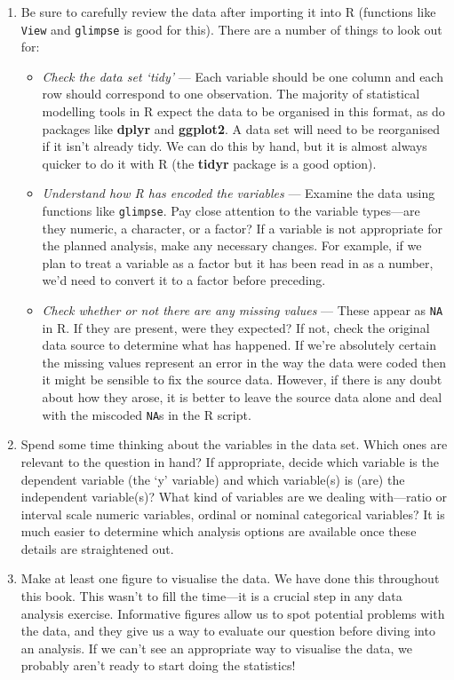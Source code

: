 \documentclass[
]{book}
\providecommand{\tightlist}{%
  \setlength{\itemsep}{0pt}\setlength{\parskip}{0pt}}
\begin{document}
\begin{enumerate}
\def\labelenumi{\arabic{enumi}.}
\item
  Be sure to carefully review the data after importing it into R (functions like \texttt{View} and \texttt{glimpse} is good for this). There are a number of things to look out for:

  \begin{itemize}
  \tightlist
  \item
    \emph{Check the data set `tidy'} --- Each variable should be one column and each row should correspond to one observation. The majority of statistical modelling tools in R expect the data to be organised in this format, as do packages like \textbf{dplyr} and \textbf{ggplot2}. A data set will need to be reorganised if it isn't already tidy. We can do this by hand, but it is almost always quicker to do it with R (the \textbf{tidyr} package is a good option).
  \item
    \emph{Understand how R has encoded the variables} --- Examine the data using functions like \texttt{glimpse}. Pay close attention to the variable types---are they numeric, a character, or a factor? If a variable is not appropriate for the planned analysis, make any necessary changes. For example, if we plan to treat a variable as a factor but it has been read in as a number, we'd need to convert it to a factor before preceding.
  \item
    \emph{Check whether or not there are any missing values} --- These appear as \texttt{NA} in R. If they are present, were they expected? If not, check the original data source to determine what has happened. If we're absolutely certain the missing values represent an error in the way the data were coded then it might be sensible to fix the source data. However, if there is any doubt about how they arose, it is better to leave the source data alone and deal with the miscoded \texttt{NA}s in the R script.
  \end{itemize}
\item
  Spend some time thinking about the variables in the data set. Which ones are relevant to the question in hand? If appropriate, decide which variable is the dependent variable (the `y' variable) and which variable(s) is (are) the independent variable(s)? What kind of variables are we dealing with---ratio or interval scale numeric variables, ordinal or nominal categorical variables? It is much easier to determine which analysis options are available once these details are straightened out.
\item
  Make at least one figure to visualise the data. We have done this throughout this book. This wasn't to fill the time---it is a crucial step in any data analysis exercise. Informative figures allow us to spot potential problems with the data, and they give us a way to evaluate our question before diving into an analysis. If we can't see an appropriate way to visualise the data, we probably aren't ready to start doing the statistics!
\end{enumerate}
\end{document}
